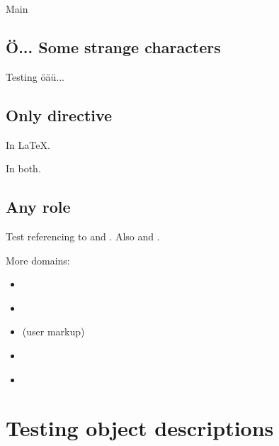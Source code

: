 \documentclass[letterpaper,10pt,english]{sphinxhowto}
\begin{document}
Main


\subsection{Ö... Some strange characters}
\label{markup:olabel}\label{markup:o-some-strange-characters}
Testing öäü...


\subsection{Only directive}
\label{markup:only-directive}
In LaTeX.

In both.


\subsection{Any role}
\label{markup:any-role}
Test referencing to {\hyperref[markup:with]{}} and {\hyperref[objects:func_without_body]{}}.
Also {\hyperref[objects:module\string-mod]{}} and {\hyperref[objects:Time]{}}.

More domains:
\begin{itemize}
\item {} 
{\hyperref[objects:bar.baz]{}}

\item {} 
{\hyperref[objects:c.SphinxType]{}}

\item {} 
{\hyperref[objects:userdesc\string-myobj]{}} (user markup)

\item {} 
{\hyperref[objects:_CPPv2N1n5ArrayE]{}}

\item {} 
{\hyperref[objects:cmdoption\string-perl\string-c]{}}

\end{itemize}


\section{Testing object descriptions}
\label{objects:testing-object-descriptions}\label{objects::doc}
\end{document}
